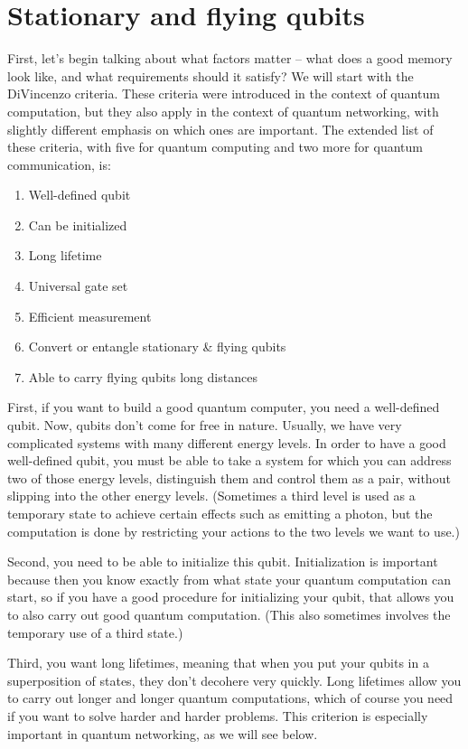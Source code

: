 \section{Stationary and flying qubits}

First, let's begin talking about what factors matter -- what does a good memory look like, and what requirements should it satisfy?  We will start with the DiVincenzo criteria. These criteria were introduced in the context of quantum computation, but they also apply in the context of quantum networking, with slightly different emphasis on which ones are important.  The extended list of these criteria, with five for quantum computing and two more for quantum communication, is:

\begin{enumerate}
    \item Well-defined qubit
    \item Can be initialized
    \item Long lifetime
    \item Universal gate set
    \item Efficient measurement
    \item Convert or entangle stationary \& flying qubits
    \item Able to carry flying qubits long distances
\end{enumerate}

First, if you want to build a good quantum computer, you need a well-defined qubit. Now, qubits don't come for free in nature. Usually, we have very complicated systems with many different energy levels. In order to have a good well-defined qubit, you must be able to take a system for which you can address two of those energy levels, distinguish them and control them as a pair, without slipping into the other energy levels.  (Sometimes a third level is used as a temporary state to achieve certain effects such as emitting a photon, but the computation is done by restricting your actions to the two levels we want to use.)

Second, you need to be able to initialize this qubit. Initialization is important because then you know exactly from what state your quantum computation can start, so if you have a good procedure for initializing your qubit, that allows you to also carry out good quantum computation.  (This also sometimes involves the temporary use of a third state.)

Third, you want long lifetimes, meaning that when you put your qubits in a superposition of states, they don't decohere very quickly. Long lifetimes allow you to carry out longer and longer quantum computations, which of course you need if you want to solve harder and harder problems.  This criterion is especially important in quantum networking, as we will see below.

